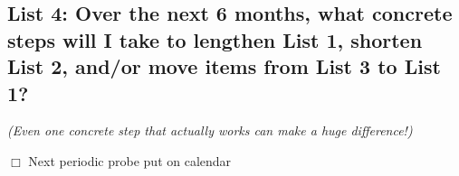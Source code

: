 \documentclass[letterpaper,oneside,11pt,article, portrait]{memoir}
\begin{document}
\subsection{List 4: Over the next 6 months, what concrete steps will I take to lengthen List 1, shorten List 2, and/or move items from List 3 to List 1?}
\small{\itshape{(Even one concrete step that actually works can make a huge difference!)}}
\vspace{1.5in}

\noindent $\Box$ Next periodic probe put on calendar
\end{document}
